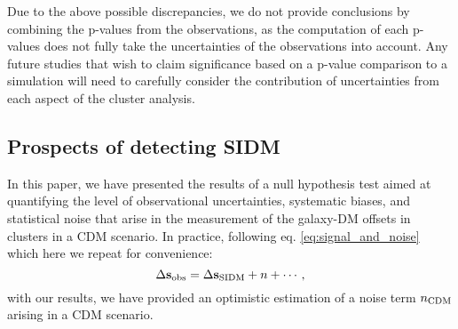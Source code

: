 \documentclass[usenatbib]{mn2e}
\newcommand{\offset}{\Delta {\bf s}}
\newcommand{\SIDM}{{\rm SIDM}}
\begin{document}
{%
%
Due to the above possible discrepancies, we do not provide conclusions by combining the p-values from
the observations, as the computation of each p-values does not fully
take the uncertainties of the observations into account. 
Any future studies that wish to claim significance based on a 
p-value comparison to a simulation will 
need to carefully consider the contribution of uncertainties 
from each aspect of the cluster analysis. 



\subsection{Prospects of detecting SIDM} 
\label{subsec:prospect_of_detecting_SIDM}

In this paper, we have presented the results of a null hypothesis test aimed at quantifying the level of observational uncertainties, systematic biases, and statistical noise that arise in the measurement of the galaxy-DM offsets in clusters in a CDM scenario. In practice, following eq. \ref{eq:signal_and_noise} which here we repeat for convenience:
\begin{equation}
\nonumber
	\offset_{\rm obs} = \offset_{\SIDM} + n + \cdots,
\end{equation}
with our results, we have provided an optimistic estimation of a noise term $n_{\rm CDM}$ arising in a CDM scenario.
 
}
\end{document}
